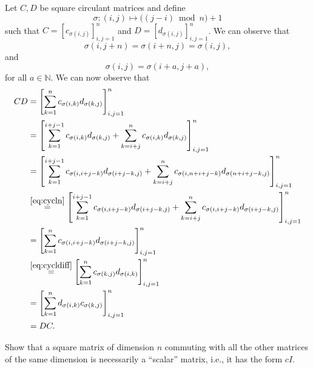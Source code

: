 \begin{solution}
  Let $C,D$ be square circulant matrices and define
  \[ \sigma \colon (i,j) \mapsto \big((j - i) \bmod{n}\big)+1 \]
  such that
  $C = [c_{\sigma(i,j)}]_{i,j=1}^{n}$ and
  $D = [d_{\sigma(i,j)}]_{i,j=1}^{n}$.
  We can observe that
  \begin{equation}
    \label{eq:cycln}
    \sigma(i,j+n) = \sigma(i+n,j) = \sigma(i,j),
  \end{equation}
  and
  \begin{equation}
    \label{eq:cycldiff}
    \sigma(i,j) = \sigma(i+a,j+a),
  \end{equation}
  for all $a \in \mathbb{N}$.
  We can now observe that
  \begin{align*}
    CD
    & =
    \left[
      \sum_{k=1}^n
      c_{\sigma(i,k)}d_{\sigma(k,j)}
    \right]_{i,j=1}^{n}\\
    & =
    \left[
      \sum_{k=1}^{i+j-1}
      c_{\sigma(i,k)}d_{\sigma(k,j)}
      +
      \sum_{k=i+j}^{n}
      c_{\sigma(i,k)}d_{\sigma(k,j)}
    \right]_{i,j=1}^{n}\\
    & =
    \left[
      \sum_{k=1}^{i+j-1}
      c_{\sigma(i,i+j-k)}d_{\sigma(i+j-k,j)}
      +
      \sum_{k=i+j}^{n}
      c_{\sigma(i,n+i+j-k)}d_{\sigma(n+i+j-k,j)}
    \right]_{i,j=1}^{n}\\
    & \stackrel{\eqref{eq:cycln}}{=}
    \left[
      \sum_{k=1}^{i+j-1}
      c_{\sigma(i,i+j-k)}d_{\sigma(i+j-k,j)}
      +
      \sum_{k=i+j}^{n}
      c_{\sigma(i,i+j-k)}d_{\sigma(i+j-k,j)}
    \right]_{i,j=1}^{n}\\
    & =
    \left[
      \sum_{k=1}^n
      c_{\sigma(i,i+j-k)}d_{\sigma(i+j-k,j)}
    \right]_{i,j=1}^{n}\\
    & \stackrel{\eqref{eq:cycldiff}}{=}
    \left[
      \sum_{k=1}^n
      c_{\sigma(k,j)}d_{\sigma(i,k)}
    \right]_{i,j=1}^{n}\\
    &=
    \left[
    \sum_{k=1}^n
    d_{\sigma(i,k)}c_{\sigma(k,j)}
    \right]_{i,j=1}^{n}\\
    & = DC.
  \end{align*}
\end{solution}

Show that a square matrix of dimension \(n\) commuting with all the other matrices of the same dimension is necessarily a ``scalar'' matrix, i.e., it has the form \(cI\).

